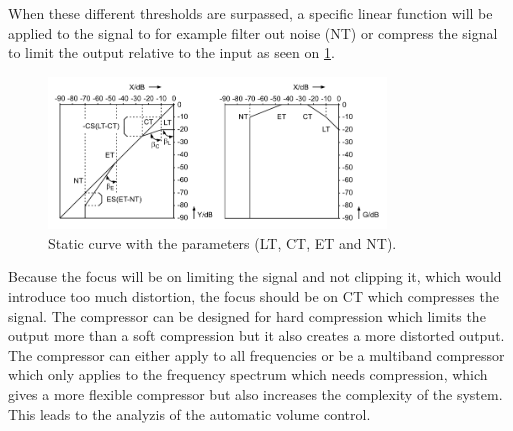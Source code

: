 When these different thresholds are surpassed, a specific linear function will be applied to the signal to for example filter out noise (NT) or compress the signal to limit the output relative to the input as seen on \ref{fig:limiter_static}. 

\begin{figure}[H]
\centering
\includegraphics[width=0.8\textwidth]{figures/limiter_static_curve.png}
\caption{Static curve with the parameters (LT, CT, ET and NT).}
\label{fig:limiter_static}
\end{figure}  

Because the focus will be on limiting the signal and not clipping it, which would introduce too much distortion, the focus should be on CT which compresses the signal. The compressor can be designed for hard compression which limits the output more than a soft compression but it also creates a more distorted output. The compressor can either apply to all frequencies or be a multiband compressor which only applies to the frequency spectrum which needs compression, which gives a more flexible compressor but also increases the complexity of the system. This leads to the analyzis of the automatic volume control.    

      
